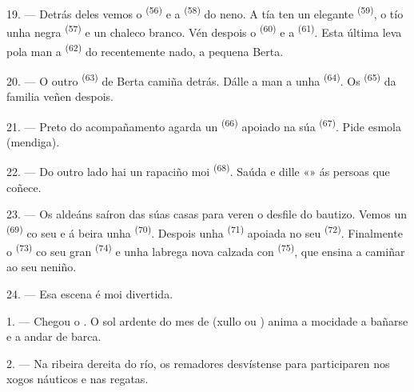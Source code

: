 19. --- Detrás deles vemos o  \textsuperscript{(56)} e a 
\textsuperscript{(58)} do neno. A tía ten un elegante 
\textsuperscript{(59)}, o tío unha  negra \textsuperscript{(57)} e un chaleco
branco. Vén despois o  \textsuperscript{(60)} e a
 \textsuperscript{(61)}. Esta última leva pola man a 
\textsuperscript{(62)} do recentemente nado, a pequena Berta.

20. --- O outro  \textsuperscript{(63)} de Berta camiña detrás. Dálle a man a
unha  \textsuperscript{(64)}. Os  \textsuperscript{(65)} da
familia veñen despois.

\VUsaut{4.6mm}
\VUsaut{3.4mm}

21. --- Preto do acompañamento agarda un  \textsuperscript{(66)} apoiado na
súa  \textsuperscript{(67)}. Pide esmola (mendiga).

22. --- Do outro lado hai un rapaciño moi  \textsuperscript{(68)}. Saúda e
dille «» ás persoas que coñece.

23. --- Os aldeáns saíron das súas casas para veren o desfile do bautizo. Vemos un
 \textsuperscript{(69)} co seu  e á beira
unha  \textsuperscript{(70)}. Despois unha 
\textsuperscript{(71)} apoiada no seu  \textsuperscript{(72)}. Finalmente o
 \textsuperscript{(73)} co seu gran 
\textsuperscript{(74)} e unha labrega nova calzada con  \textsuperscript{(75)},
que ensina a camiñar ao seu neniño.

24. --- Esa escena é moi divertida.

\VUsaut{4.0mm}
\VUsaut{3.0mm}

\VUsaut{2.4mm}

\VUsaut{3.0mm}

1. --- Chegou o . O sol ardente do mes de  (xullo ou
) anima a mocidade a bañarse e a andar de barca.

2. --- Na ribeira dereita do río, os remadores desvístense para participaren nos xogos
náuticos e nas regatas.

